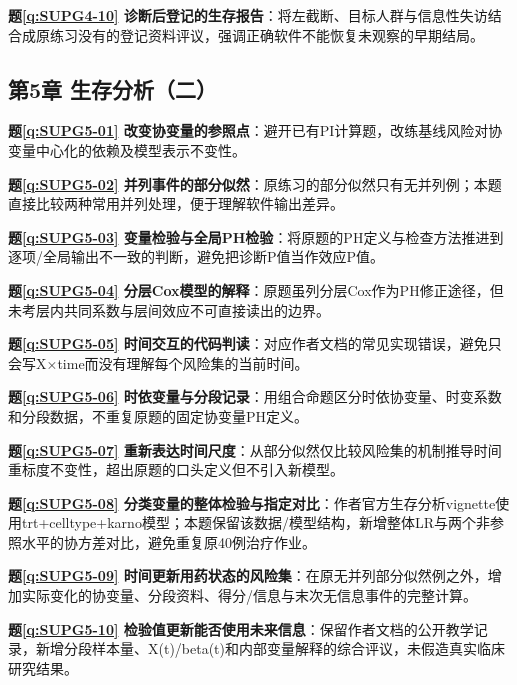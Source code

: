 \noindent\textbf{题\ref*{q:SUPG4-10} 诊断后登记的生存报告}：将左截断、目标人群与信息性失访结合成原练习没有的登记资料评议，强调正确软件不能恢复未观察的早期结局。\par

\subsection*{第5章 生存分析（二）}

\noindent\textbf{题\ref*{q:SUPG5-01} 改变协变量的参照点}：避开已有PI计算题，改练基线风险对协变量中心化的依赖及模型表示不变性。\par

\noindent\textbf{题\ref*{q:SUPG5-02} 并列事件的部分似然}：原练习的部分似然只有无并列例；本题直接比较两种常用并列处理，便于理解软件输出差异。\par

\noindent\textbf{题\ref*{q:SUPG5-03} 变量检验与全局PH检验}：将原题的PH定义与检查方法推进到逐项/全局输出不一致的判断，避免把诊断P值当作效应P值。\par

\noindent\textbf{题\ref*{q:SUPG5-04} 分层Cox模型的解释}：原题虽列分层Cox作为PH修正途径，但未考层内共同系数与层间效应不可直接读出的边界。\par

\noindent\textbf{题\ref*{q:SUPG5-05} 时间交互的代码判读}：对应作者文档的常见实现错误，避免只会写X×time而没有理解每个风险集的当前时间。\par

\noindent\textbf{题\ref*{q:SUPG5-06} 时依变量与分段记录}：用组合命题区分时依协变量、时变系数和分段数据，不重复原题的固定协变量PH定义。\par

\noindent\textbf{题\ref*{q:SUPG5-07} 重新表达时间尺度}：从部分似然仅比较风险集的机制推导时间重标度不变性，超出原题的口头定义但不引入新模型。\par

\noindent\textbf{题\ref*{q:SUPG5-08} 分类变量的整体检验与指定对比}：作者官方生存分析vignette使用trt+celltype+karno模型；本题保留该数据/模型结构，新增整体LR与两个非参照水平的协方差对比，避免重复原40例治疗作业。\par

\noindent\textbf{题\ref*{q:SUPG5-09} 时间更新用药状态的风险集}：在原无并列部分似然例之外，增加实际变化的协变量、分段资料、得分/信息与末次无信息事件的完整计算。\par

\noindent\textbf{题\ref*{q:SUPG5-10} 检验值更新能否使用未来信息}：保留作者文档的公开教学记录，新增分段样本量、X(t)/beta(t)和内部变量解释的综合评议，未假造真实临床研究结果。\par

